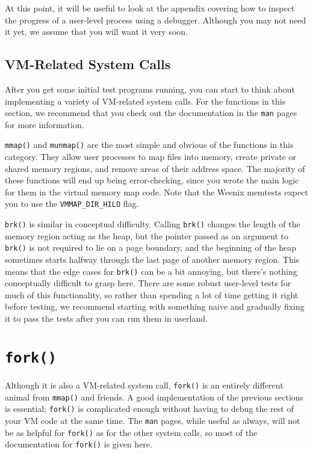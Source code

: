 At this point, it will be useful to look at the  appendix covering how to inspect the progress of a user-level process using a debugger. Although you may not need it yet, we assume that you will want it very soon.

\subsection{VM-Related System Calls}

After you get some initial test programs running, you can start to think about implementing a variety of VM-related system calls. For the functions in this section, we recommend that you check out the documentation in the \texttt{man} pages for more information.

\texttt{mmap()} and \texttt{munmap()} are the most simple and obvious of the functions in this category. They allow user processes to map files into memory, create private or shared memory regions, and remove areas of their address space. The majority of these functions will end up being error-checking, since you wrote the main logic for them in the virtual memory map code.  Note that the Weenix memtests expect you to use the \texttt{VMMAP\_DIR\_HILO} flag.

\texttt{brk()} is similar in conceptual difficulty. Calling \texttt{brk()} changes the length of the memory region acting as the heap, but the pointer passed as an argument to \texttt{brk()} is not required to lie on a page boundary, and the beginning of the heap sometimes starts halfway through the last page of another memory region. This means that the edge cases for \texttt{brk()} can be a bit annoying, but there's nothing conceptually difficult to grasp here. There are some robust user-level tests for much of this functionality, so rather than spending a lot of time getting it right before testing, we recommend starting with something naive and gradually fixing it to pass the tests after you can run them in userland.

\section{\texttt{fork()}}

Although it is also a VM-related system call, \texttt{fork()} is an entirely different animal from \texttt{mmap()} and friends. A good implementation of the previous sections is essential; \texttt{fork()} is complicated enough without having to debug the rest of your VM code at the same time. The \texttt{man} pages, while useful as always, will not be as helpful for \texttt{fork()} as for the other system calls, so most of the documentation for \texttt{fork()} is given here.

